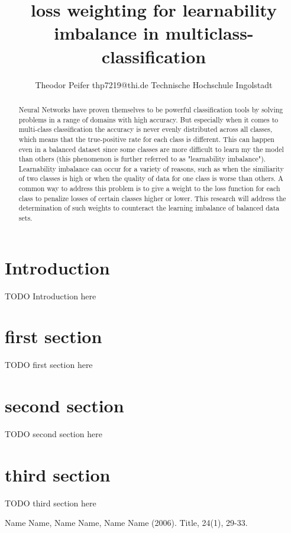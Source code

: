 \documentclass[journal]{IEEEtran}
\begin{document}
\title{loss weighting for learnability imbalance in multiclass-classification}



\author{Theodor Peifer
        \linebreak
        thp7219@thi.de
        \linebreak
        Technische Hochschule Ingolstadt
}



\maketitle


\begin{abstract}
Neural Networks have proven themselves to be powerful classification 
tools by solving problems in a range of domains with high accuracy. 
But especially when it comes to multi-class classification the accuracy is never evenly distributed across all classes, which means that the true-positive rate for each class is different.
This can happen even in a balanced dataset since some classes are more difficult to learn my the model than others (this phenomenon is further referred to as "learnability imbalance").
Learnability imbalance can occur for a variety of reasons, such as when the similiarity of two classes is high or when the quality of data for one class is worse than others.
A common way to address this problem is to give a weight to the loss function for each class to penalize losses of certain classes higher or lower. 
This research will address the determination of such weights to counteract the learning imbalance of balanced data sets.
\end{abstract}


\section{Introduction}
TODO Introduction here


\section{first section}
TODO first section here


\section{second section}
TODO second section here


\section{third section}
TODO third section here


\begin{thebibliography}{1}

\bibitem{}
Name Name, Name Name, Name Name (2006). Title, 24(1), 29-33.

\end{thebibliography}
\end{document}
